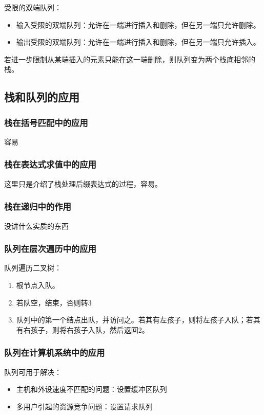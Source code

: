 \documentclass[12pt, a4paper, oneside]{ctexart}
\begin{document}
受限的双端队列：
\begin{itemize}
  \item 输入受限的双端队列：允许在一端进行插入和删除，但在另一端只允许删除。
  \item 输出受限的双端队列：允许在一端进行插入和删除，但在另一端只允许插入。
\end{itemize}
若进一步限制从某端插入的元素只能在这一端删除，则队列变为两个栈底相邻的栈。

\subsection{栈和队列的应用}

\subsubsection{栈在括号匹配中的应用}

容易

\subsubsection{栈在表达式求值中的应用}

这里只是介绍了栈处理后缀表达式的过程，容易。

\subsubsection{栈在递归中的作用}

没讲什么实质的东西

\subsubsection{队列在层次遍历中的应用}

队列遍历二叉树：
\begin{enumerate}
  \item 根节点入队。
  \item 若队空，结束，否则转3
  \item 队列中的第一个结点出队，并访问之。若其有左孩子，则将左孩子入队；若其有右孩子，则将右孩子入队，然后返回2。
\end{enumerate}

\subsubsection{队列在计算机系统中的应用}

队列可用于解决：
\begin{itemize}
  \item 主机和外设速度不匹配的问题：设置缓冲区队列
  \item 多用户引起的资源竞争问题：设置请求队列
\end{itemize}
\end{document}
